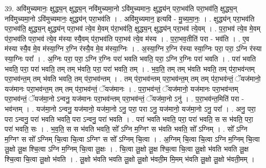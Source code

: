 \documentclass[17pt]{extarticle}
\begin{document}
39. अवि॑मुच्यमानः॒ क्षुद्ध्य॒न् क्षुद्ध्य॒न् नवि॑मुच्यमा॒नो ऽवि॑मुच्यमानः॒ क्षुद्ध्य॑न् परा॒भव॑ति परा॒भव॑ति॒ क्षुद्ध्य॒न् नवि॑मुच्यमा॒नो ऽवि॑मुच्यमानः॒ क्षुद्ध्य॑न् परा॒भव॑ति । . अवि॑मुच्यमान॒ इत्यवि॑ - मु॒च्य॒मा॒नः॒ । . क्षुद्ध्य॑न् परा॒भव॑ति परा॒भव॑ति॒ क्षुद्ध्य॒न् क्षुद्ध्य॑न् परा॒भव॑ त्ये॒व मे॒वम् प॑रा॒भव॑ति॒ क्षुद्ध्य॒न् क्षुद्ध्य॑न् परा॒भव॑ त्ये॒वम् । . प॒रा॒भव॑ त्ये॒व मे॒वम् प॑रा॒भव॑ति परा॒भव॑ त्ये॒व म॑स्या स्यै॒वम् प॑रा॒भव॑ति परा॒भव॑ त्ये॒व म॑स्य । . प॒रा॒भव॒तीति॑ परा - भव॑ति । . ए॒व म॑स्या स्यै॒व मे॒व म॑स्या॒ग्नि र॒ग्नि र॑स्यै॒व मे॒व म॑स्या॒ग्निः । . अ॒स्या॒ग्नि र॒ग्नि र॑स्या स्या॒ग्निः परा॒ परा॒ ऽग्नि र॑स्या स्या॒ग्निः परा᳚ । . अ॒ग्निः परा॒ परा॒ ऽग्नि र॒ग्निः परा॑ भवति भवति॒ परा॒ ऽग्नि र॒ग्निः परा॑ भवति । . परा॑ भवति भवति॒ परा॒ परा॑ भवति॒ तम् तम् भ॑वति॒ परा॒ परा॑ भवति॒ तम् । . भ॒व॒ति॒ तम् तम् भ॑वति भवति॒ तम् प॑रा॒भव॑न्तम् परा॒भव॑न्त॒म् तम् भ॑वति भवति॒ तम् प॑रा॒भव॑न्तम् । . तम् प॑रा॒भव॑न्तम् परा॒भव॑न्त॒म् तम् तम् प॑रा॒भव॑न्तं॒ ॅयज॑मानो॒ यज॑मानः परा॒भव॑न्त॒म् तम् तम् प॑रा॒भव॑न्तं॒ ॅयज॑मानः । . प॒रा॒भव॑न्तं॒ ॅयज॑मानो॒ यज॑मानः परा॒भव॑न्तम् परा॒भव॑न्तं॒ ॅयज॑मा॒नो ऽन्वनु॒ यज॑मानः परा॒भव॑न्तम् परा॒भव॑न्तं॒ ॅयज॑मा॒नो ऽनु॑ । . प॒रा॒भव॑न्त॒मिति॑ परा - भव॑न्तम् । . यज॑मा॒नो ऽन्वनु॒ यज॑मानो॒ यज॑मा॒नो ऽनु॒ परा॒ परा ऽनु॒ यज॑मानो॒ यज॑मा॒नो ऽनु॒ परा᳚ । . अनु॒ परा॒ परा ऽन्वनु॒ परा॑ भवति भवति॒ परा ऽन्वनु॒ परा॑ भवति । . परा॑ भवति भवति॒ परा॒ परा॑ भवति॒ स स भ॑वति॒ परा॒ परा॑ भवति॒ सः । . भ॒व॒ति॒ स स भ॑वति भवति॒ सो᳚ ऽग्नि म॒ग्निꣳ स भ॑वति भवति॒ सो᳚ ऽग्निम् । . सो᳚ ऽग्नि म॒ग्निꣳ स सो᳚ ऽग्निम् चि॒त्वा चि॒त्वा ऽग्निꣳ स सो᳚ ऽग्निम् चि॒त्वा । . अ॒ग्निम् चि॒त्वा चि॒त्वा ऽग्नि म॒ग्निम् चि॒त्वा लू॒क्षो लू॒क्ष श्चि॒त्वा ऽग्नि म॒ग्निम् चि॒त्वा लू॒क्षः । . चि॒त्वा लू॒क्षो लू॒क्ष श्चि॒त्वा चि॒त्वा लू॒क्षो भ॑वति भवति लू॒क्ष श्चि॒त्वा चि॒त्वा लू॒क्षो भ॑वति । . लू॒क्षो भ॑वति भवति लू॒क्षो लू॒क्षो भ॑वती॒म मि॒मम् भ॑वति लू॒क्षो लू॒क्षो भ॑वती॒मम् । \newline
\pagebreak
{}
\end{document}
